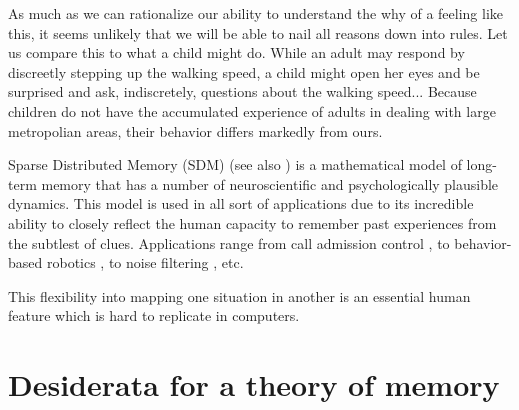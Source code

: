 As much as we can rationalize our ability to understand the why of a feeling like this, it seems unlikely that we will be able to nail all reasons down into rules.  Let us compare this to what a child might do.  While an adult may respond by discreetly stepping up the walking speed, a child might open her eyes and be surprised and ask, indiscretely, questions about the walking speed... Because children do not have the accumulated experience of adults in dealing with large metropolian areas, their behavior differs markedly from ours.

Sparse Distributed Memory (SDM) \citep{Kanerva1988} (see also \citep{denning_sparse_1989,  flynn_sparse_1989, kanerva_sparse_1993, kanerva_parallel_1985, goos_binary_1996, kanerva_hyperdimensional_2009,  keeler_comparison_1988, rwcp_fully_1997, marinaro_spatter_1994, sahlgren_permutations_nodate, uesaka_foundations_2001}) is a mathematical model of long-term memory that has a number of neuroscientific and psychologically plausible dynamics. This model is used in all sort of applications due to its incredible ability to closely reflect the human capacity to remember past experiences from the subtlest of clues. Applications range from call admission control \citep{kwon_atm_1998, hee-yong_kwon_atm_1997}, to behavior-based robotics \citep{Rajesh1998, mendes2008robot, jockel_sparse_2009}, to noise filtering \citep{meng_modified_2009}, etc.

This flexibility into mapping one situation in another is an essential human feature which is hard to replicate in computers.

\section{Desiderata for a theory of memory}


